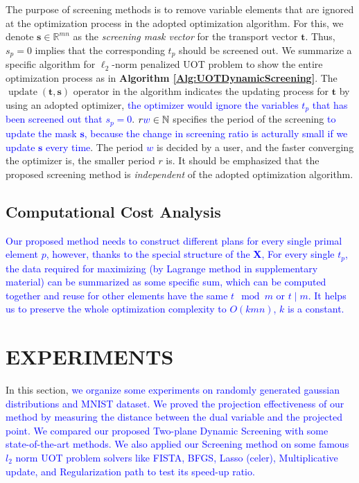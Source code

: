 \documentclass[twoside]{article}
\theoremstyle{plain}
\newcommand{\mat}[1]{\mathbf{#1}}
\renewcommand{\vec}[1]{\bm{#1}}
\newcommand{\changeXS}[1]{\textcolor{blue}{#1}}
\begin{document}
The purpose of screening methods is to remove variable elements that are ignored at the optimization process in the adopted optimization algorithm. For this, we denote $\vec{s} \in \mathbb{R}^{mn}$ as the {\it screening mask vector} for the transport vector $\vec{t}$. Thus, $s_p = 0$ implies that the corresponding $t_p$ should be screened out. We summarize a specific algorithm for $\ell_2$-norm penalized UOT problem to show the entire optimization process as in {\bf Algorithm \ref{Alg:UOTDynamicScreening}}. The $\operatorname{update}(\vec{t},\vec s)$ operator in the algorithm indicates the updating process for $\vec{t}$ by using an adopted optimizer, \changeXS{the optimizer would ignore the variables $t_p$ that has been screened out that $s_p =0$}. $r\changeXS{w} \in \mathbb{N}$ specifies the period of the screening \changeXS{to update the mask $\vec s$, because the change in screening ratio is acturally small if we update $\vec s$ every time}. The period \changeXS{$w$} is decided by a user, and the faster converging the optimizer is, the smaller period $r$ is. It should be emphasized that the proposed screening method is {\it independent} of the adopted optimization algorithm. 

\subsection{Computational Cost Analysis}
\changeXS{Our proposed method needs to construct different plans for every single primal element $p$, however, thanks to the special structure of the $\mat X$, For every single $t_p$, the data required for maximizing (by Lagrange method in supplementary material) can be summarized as some specific sum, which can be computed together and reuse for other elements have the same $t \mod m $ or $t \mid m$. It helps us to preserve the whole optimization complexity to $O(kmn)$, $k$ is a constant.}

\section{EXPERIMENTS}
\label{sec:exp}
In this section, \changeXS{we organize some experiments on randomly generated gaussian distributions and MNIST dataset. We proved the projection effectiveness of our method by measuring the distance between the dual variable and the projected point. We compared our proposed Two-plane Dynamic Screening with some state-of-the-art methods. We also applied our Screening method on some famous $l_2$ norm UOT problem solvers like FISTA, BFGS, Lasso (celer), Multiplicative update, and Regularization path to test its speed-up ratio.}
\end{document}
